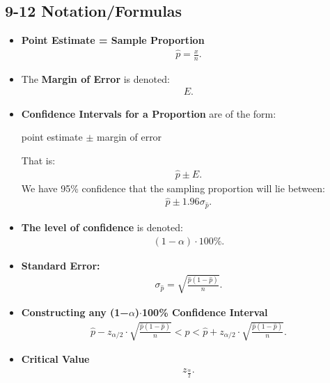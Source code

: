 \documentclass{report}
\begin{document}
        \pagebreak 
        \subsection*{9-12 Notation/Formulas}
        \begin{itemize}
                  \item \textbf{Point Estimate = Sample Proportion}
            \begin{align*}
                \hat{p} = \frac{x}{n}
            .\end{align*}
        \item The \textbf{Margin of Error} is denoted:
            \begin{align*}
                E 
            .\end{align*}
        \item \textbf{Confidence Intervals for a Proportion} are of the form:
            \begin{center}
                point estimate $\pm $ margin of error
            \end{center}
            That is:
            \begin{align*}
               \hat{p} \pm E 
            .\end{align*}
            We have 95\% confidence that the sampling proportion will lie between:
            \begin{align*}
                \hat{p} \pm 1.96 \sigma_{\hat{p}}  
            .\end{align*}
        \item \textbf{The level of confidence} is denoted:
            \begin{align*}
                (1-\alpha) \cdot 100\%
            .\end{align*}
        \item \textbf{Standard Error:}
            \begin{align*}
                \sigma_{\hat{p}} = \sqrt{\frac{\hat{p}(1-\hat{p})}{n}}
            .\end{align*}
        \item \textbf{Constructing any (1−$\alpha $)$\cdot  $100\% Confidence Interval}
            \begin{align*}
                \hat{p} - z_{\alpha/2} \cdot \sqrt{\frac{\hat{p}(1-\hat{p})}{n}} < p < \hat{p} + z_{\alpha/2} \cdot \sqrt{\frac{\hat{p}(1-\hat{p})}{n}}
            .\end{align*}

        \item \textbf{Critical Value}
            \begin{align*}
                z_{ \frac{\alpha}{2}}
            .\end{align*}
            \bigbreak \noindent \bigbreak \noindent
        \end{itemize}
\end{document}
